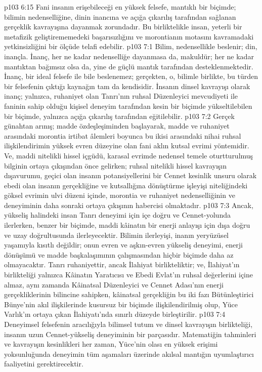 \vs p103 6:15 Fani insanın erişebileceği en yüksek felsefe, mantıklı bir biçimde; bilimin nedenselliğine, dinin inancına ve açığa çıkarılış tarafından sağlanan gerçeklik kavrayışına dayanmak zorundadır. Bu birliktelikle insan, yeterli bir metafizik geliştirememedeki başarısızlığını ve morontianın motasını kavramadaki yetkinsizliğini bir ölçüde telafi edebilir.
\vs p103 7:1 Bilim, nedensellikle beslenir; din, inançla. İnanç, her ne kadar nedenselliğe dayanmasa da, makuldür; her ne kadar mantıktan bağımsız olsa da, yine de güçlü mantık tarafından desteklenmektedir. İnanç, bir ideal felsefe ile bile beslenemez; gerçekten, o, bilimle birlikte, bu türden bir felsefenin çıktığı kaynağın tam da kendisidir. İnsanın dinsel kavrayışı olarak inanç; yalnızca, ruhaniyet olan Tanrı’nın ruhsal Düzenleyici mevcudiyeti ile faninin sahip olduğu kişisel deneyim tarafından kesin bir biçimde yükseltilebilen bir biçimde, yalnızca açığa çıkarılış tarafından eğitilebilir.
\vs p103 7:2 Gerçek günahtan arınış; madde özdeşleşiminden başlayarak, madde ve ruhaniyet arasındaki morontia irtibat âlemleri boyunca bu ikisi arasındaki nihai ruhsal ilişkilendirimin yüksek evren düzeyine olan fani aklın kutsal evrimi yöntemidir. Ve, maddi nitelikli hissel içgüdü, karasal evrimde nedensel temele oturtturulmuş bilginin ortaya çıkışından önce gelirken; ruhsal nitelikli hissel kavrayışın dışavurumu, geçici olan insanın potansiyellerini bir Cennet kesinlik unsuru olarak ebedi olan insanın gerçekliğine ve kutsallığına dönüştürme işleyişi niteliğindeki göksel evrimin ulvi düzeni içinde, morontia ve ruhaniyet nedenselliğinin ve deneyiminin daha sonraki ortaya çıkışının habercisi olmaktadır.
\vs p103 7:3 Ancak, yükseliş halindeki insan Tanrı deneyimi için içe doğru ve Cennet\hyp{}yolunda ilerlerken, benzer bir biçimde, maddi kâinatın bir enerji anlayışı için dışa doğru ve uzay doğrultusunda ilerleyecektir. Bilimin ilerleyişi, inanın yeryüzüsel yaşamıyla kısıtlı değildir; onun evren ve aşkın\hyp{}evren yükseliş deneyimi, enerji dönüşümü ve madde başkalaşımının çalışmasından hiçbir biçimde daha az olmayacaktır. Tanrı ruhaniyettir, ancak İlahiyat birlikteliktir; ve, İlahiyat’ın birlikteliği yalnızca Kâinatın Yaratıcısı ve Ebedi Evlat’ın ruhsal değerlerini içine almaz, aynı zamanda Kâinatsal Düzenleyici ve Cennet Adası’nın enerji gerçekliklerinin bilincine sahipken, kâinatsal gerçekliğin bu iki fazı Bütünleştirici Bünye’nin akıl ilişkilerinde kusursuz bir biçimde ilişkilendirilmiş olup, Yüce Varlık’ın ortaya çıkan İlahiyatı’nda sınırlı düzeyde birleştirilir.
\vs p103 7:4 Deneyimsel felsefenin aracılığıyla bilimsel tutum ve dinsel kavrayışın birlikteliği, insanın uzun Cennet\hyp{}yükseliş deneyiminin bir parçasıdır. Matematiğin tahminleri ve kavrayışın kesinlikleri her zaman, Yüce’nin olası en yüksek erişimi yoksunluğunda deneyimin tüm aşamaları üzerinde akılsal mantığın uyumlaştırıcı faaliyetini gerektirecektir.
